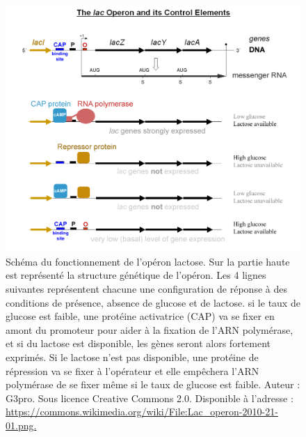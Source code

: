 \begin{figure}[htbp]
    \centering
    \includegraphics[width=\linewidth]{images/Lac_operon-2010-21-01.png}
    \caption[Exemple de l'opéron lactose]{Schéma du fonctionnement de l'opéron lactose. Sur la partie haute est représenté la structure génétique de l'opéron. Les 4 lignes suivantes représentent chacune une configuration de réponse à des conditions de présence, absence de glucose et de lactose. si le taux de glucose est faible, une protéine activatrice (CAP) va se fixer en amont du promoteur pour aider à la fixation de l'ARN polymérase, et si du lactose est disponible, les gènes seront alors fortement exprimés. Si le lactose n'est pas disponible, une protéine de répression va se fixer à l'opérateur et elle empêchera l'ARN polymérase de se fixer même si le taux de glucose est faible. 
    Auteur : G3pro. Sous licence Creative Commons 2.0. Disponible à l’adresse : \url{https://commons.wikimedia.org/wiki/File:Lac_operon-2010-21-01.png.}
    }
    \label{fig:lac_operon}
\end{figure}


